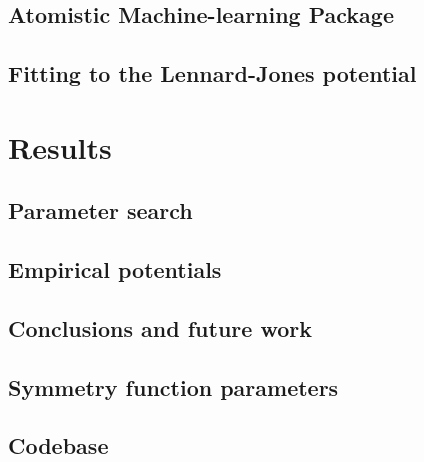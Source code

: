 \documentclass[12pt]{report}
\begin{document}
\chapter{Atomistic Machine-learning Package}


\chapter{Fitting to the Lennard-Jones potential}


\part{Results}

\chapter{Parameter search}


\chapter{Empirical potentials}


\chapter{Conclusions and future work}


\begin{appendices}

\chapter{Symmetry function parameters}

\chapter{Codebase}

\end{appendices}

\printbibliography
\end{document}
